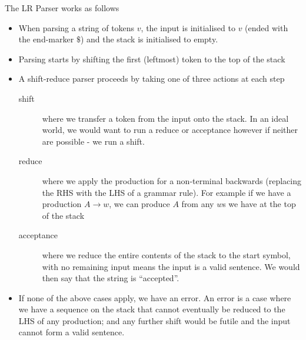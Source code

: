 The LR Parser works as follows
\begin{itemize}
    \item When parsing a string of tokens $v$, the input is initialised to $v$ (ended with the end-marker $\$$) and the stack is initialised to empty. 
    \item Parsing starts by shifting the first (leftmost) token to the top of the stack
    \item A shift-reduce parser proceeds by taking one of three actions at each step
    \begin{description}
        \item[shift] where we transfer a token from the input onto the stack. In an ideal world, we would want to run a reduce or acceptance however if neither are possible - we run a shift. 
        \item[reduce] where we apply the production for a non-terminal backwards (replacing the RHS with the LHS of a grammar rule). For example if we have a production $A \rightarrow w$, we can produce $A$ from any $w$s we have at the top of the stack
        \item[acceptance] where we reduce the entire contents of the stack to the start symbol, with no remaining input means the input is a valid sentence. We would then say that the string is ``accepted''.
    \end{description}
    \item If none of the above cases apply, we have an error. An error is a case where we have a sequence on the stack that cannot eventually be reduced to the LHS of any production; and any further shift would be futile and the input cannot form a valid sentence.
\end{itemize}